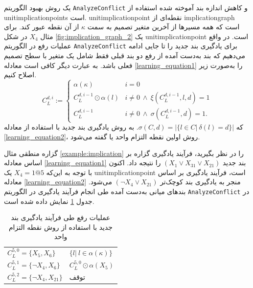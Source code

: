 یک روش بهبود الگوریتم 
\texttt{AnalyzeConflict}
و  کاهش  اندازه بند آموخته شده استفاده از  
\glspl*{unitimplicationpoint}
است.
\gls*{unitimplicationpoint}
نقطه‌ای از  
\gls*{implicationgraph} 
است که همه مسیرها از آخرین متغیر تصمیم به سمت  
$\kappa$
از آن نقطه عبور کند. برای مثال 
$X_{4}$
در شکل 
\ref{fig:implication_graph_2}
یک 
\gls*{unitimplicationpoint}
است.  در واقع عملیات رفع در  الگوریتم 
\texttt{AnalyzeConflict}
برای یادگیری بند جدید را تا جایی ادامه می‌دهیم که بند به‌دست آمده از رفع دو بند قبلی فقط شامل یک متغیر با سطح تصمیم فعلی باشد.  به عبارت دیگر کافی است معادله 
\ref{learning_equation1}
را به‌صورت زیر اصلاح کنیم. 
\begin{equation}
\label{learning_equation2}
C_{L}^{d, i}:=\left\{ 
\begin{array}{ll}
\alpha(\kappa)& i = 0\\
C_{L}^{d, i-1}\odot \alpha(l)& i \neq 0\ \wedge\ \xi(C_{L}^{d, i-1}, l, d) = 1\\
C_{L}^{d, i-1}& i\neq 0 \ \wedge \ \sigma(C_{L}^{d, i-1}, d) = 1.
\end{array}
\right.
\end{equation}
که 
$\sigma(C, d) = |\{l\in C| \ \delta(l) = d\}|$.
به روش یادگیری بند جدید با استفاده از معادله 
\ref{learning_equation2}، 
روش  اولین نقطه التزام واحد  یا 
 گفته می‌شود. 
 \begin{example}
گزاره منطقی مثال 
\ref{example:implication}
را در نظر بگیرید، فرآیند یادگیری گزاره بر اساس معادله 
\ref{learning_equation1}
بند  جدید 
$(X_{1}\vee X_{31}\vee X_{21})$
را نتیجه داد.  اکنون با توجه به این‌که 
$X_{4} = 1@5$
یک 
\gls*{unitimplicationpoint}
است، فرآیند یادگیری بر اساس معادله 
\ref{learning_equation2}
منجر به یادگیری بند  کوچک‌تر 
$(\neg X_{4}\vee X_{21})$
می‌شود. بندهای میانی به‌دست آمده  طی انجام فرآیند یادگیری در الگوریتم 
\texttt{AnalyzeConflict}
در جدول 
\ref{tab:ResolutionSteps2}
نمایش داده شده  است. 
 \end{example}
\begin{table}
\begin{center}
\begin{tabular}{ll}
	\hline 
$C_{L}^{5,0} = \{X_{5}, X_{6}\}$& $\{l| \ l\in \alpha(\kappa)\}$\\
$C_{L}^{5, 1} = \{\neg X_{4}, X_{6}\}$&$C_{L}^{5, 0}\odot \alpha(X_{5})$\\
$C_{L}^{5, 2} = \{\neg X_{4}, X_{21}\}$& توقف\\
	\hline 
\end{tabular} 
	\caption{عملیات رفع طی فرآیند یادگیری بند جدید با استفاده از روش نقطه  التزام واحد}
	\label{tab:ResolutionSteps2}
\end{center}
\end{table}
